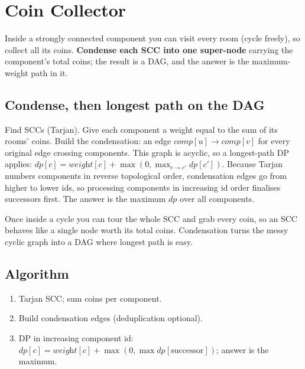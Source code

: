 \section{Coin Collector}
\label{sec:cses-coin-collector}


\begin{patternbox}
Inside a strongly connected component you can visit every room (cycle
freely), so collect all its coins. \textbf{Condense each SCC into one
super-node} carrying the component's total coins; the result is a DAG, and
the answer is the maximum-weight path in it.
\end{patternbox}

\subsection*{Condense, then longest path on the DAG}

Find SCCs (Tarjan). Give each component a weight equal to the sum of its
rooms' coins. Build the condensation: an edge $\textit{comp}[u]\to
\textit{comp}[v]$ for every original edge crossing components. This graph is
acyclic, so a longest-path DP applies: $\textit{dp}[c]=\textit{weight}[c]+
\max(0,\max_{c\to c'}\textit{dp}[c'])$. Because Tarjan numbers components in
reverse topological order, condensation edges go from higher to lower ids,
so processing components in increasing id order finalises successors first.
The answer is the maximum $\textit{dp}$ over all components.

\begin{ideabox}
Once inside a cycle you can tour the whole SCC and grab every coin, so an
SCC behaves like a single node worth its total coins. Condensation turns the
messy cyclic graph into a DAG where longest path is easy.
\end{ideabox}

\subsection*{Algorithm}

\begin{enumerate}
  \item Tarjan SCC; sum coins per component.
  \item Build condensation edges (deduplication optional).
  \item DP in increasing component id: $\textit{dp}[c]=\textit{weight}[c]+
        \max(0,\max\textit{dp}[\text{successor}])$; answer is the maximum.
\end{enumerate}

